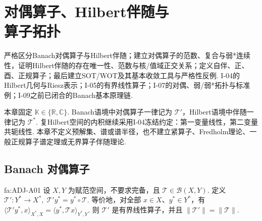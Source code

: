 \chapter[对偶算子、Hilbert伴随与算子拓扑]{对偶算子、Hilbert伴随与\protect\\算子拓扑}\label{chap:I-11}
\FAChapterOpening
{严格区分Banach对偶算子与Hilbert伴随；建立对偶算子的范数、复合与弱*连续性，证明Hilbert伴随的存在唯一性、范数与核/值域正交关系；定义自伴、正、酉、正规算子；最后建立SOT/WOT及其基本收敛工具与严格性反例.}
{I-04的Hilbert几何与Riesz表示；I-05的有界线性算子；I-07的对偶、弱/弱*拓扑与标准例；I-09之前已闭合的Banach基本原理链.}
{\begin{center}
\end{center}}

本章固定 \(\displaystyle \mathbb K\in\{\mathbb R,\mathbb C\}\). Banach语境中对偶算子一律记为 \(\displaystyle \mathcal T'\)，Hilbert语境中伴随一律记为 \(\displaystyle \mathcal T^*\). 复Hilbert空间的内积继续采用I-04冻结约定：第一变量线性，第二变量共轭线性. 本章不定义预解集、谱或谱半径，也不建立紧算子、Fredholm理论、一般正规算子谱定理或无界算子伴随理论.

\section{Banach 对偶算子}\label{sec:i11-banach-dual}

\begin{FADefinition}[A][Banach对偶算子及其范数]{fa:ADJ-A01}
设 \(\displaystyle X,Y\) 为赋范空间，不要求完备，且 \(\displaystyle \mathcal T\in\mathcal B(X,Y)\). 定义
\(\displaystyle \mathcal T':Y^*\to X^*, \; \mathcal T'y^*=y^*\circ\mathcal T\).
等价地，对全部 \(\displaystyle x\in X\)、\(\displaystyle y^*\in Y^*\)，有
\(\displaystyle \langle\mathcal T'y^*,x\rangle_{X^*,X} = \langle y^*,\mathcal T x\rangle_{Y^*,Y}\).
则 \(\displaystyle \mathcal T'\) 是有界线性算子，并且
\(\displaystyle \|\mathcal T'\|=\|\mathcal T\|\).
\end{FADefinition}


